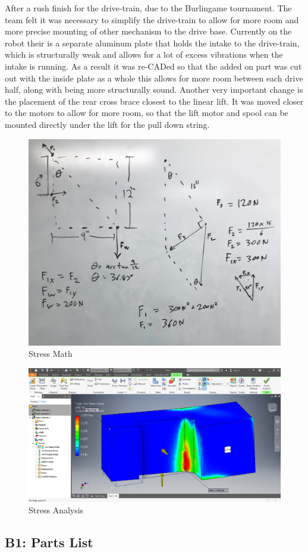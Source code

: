 \documentclass{article}
\begin{document}
After a rush finish for the drive-train, due to the Burlingame tournament. The team felt it was necessary to simplify the drive-train to allow for more room and more precise mounting of other mechanism to the drive base. Currently on the robot their is a separate aluminum plate that holds the intake to the drive-train, which is structurally  weak and allows for a lot of excess vibrations when the intake is running. As a result it was re-CADed so that the added on part was cut out with the inside plate as a whole this allows for more room between each drive half, along with being more structurally sound. Another very important change is the placement of the rear cross brace closest to the linear lift. It was moved closer to the motors to allow for more room, so that the lift motor and spool can be mounted directly under the lift for the pull down string. 

\begin{figure}
    \centering
    \includegraphics[width=.6 \textwidth]{14_12-03/images/Math.jpg}
    \caption{Stress Math}
    \label{fig:math}
\end{figure}

\begin{figure}
    \centering
    \includegraphics[width=.6\textwidth]{14_12-03/images/Stress_Analysis.png}
    \caption{Stress Analysis}
    \label{fig:stress}
\end{figure}\subsection{B1: Parts List}
\end{document}
